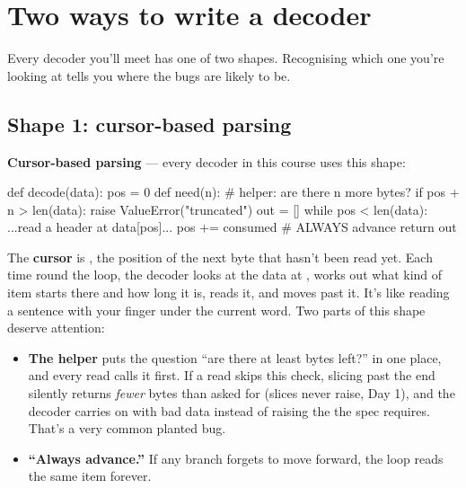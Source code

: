 \documentclass[10pt,a4paper]{article}
\begin{document}
\section{Two ways to write a decoder}
Every decoder you’ll meet has one of two shapes. Recognising which one you’re looking at tells you where the bugs are likely to be.
\subsection{Shape 1: cursor-based parsing}
\begin{keybox}
\textbf{Cursor-based parsing} — every decoder in this course uses this shape:
\end{keybox}
\begin{pycode}
def decode(data):
    pos = 0
    def need(n):                      # helper: are there n more bytes?
        if pos + n > len(data):
            raise ValueError("truncated")
    out = []
    while pos < len(data):
        ...read a header at data[pos]...
        pos += consumed               # ALWAYS advance
    return out
\end{pycode}
The \textbf{cursor} is , the position of the next byte that hasn’t been read yet. Each time round the loop, the decoder looks at the data at , works out what kind of item starts there and how long it is, reads it, and moves  past it. It’s like reading a sentence with your finger under the current word.
Two parts of this shape deserve attention:
\begin{itemize}
\item \textbf{The  helper} puts the question “are there at least  bytes left?” in one place, and every read calls it first. If a read skips this check, slicing past the end silently returns \emph{fewer} bytes than asked for (slices never raise, Day 1), and the decoder carries on with bad data instead of raising the  the spec requires. That’s a very common planted bug.
\item \textbf{“Always advance.”} If any branch forgets to move  forward, the loop reads the same item forever.
\end{itemize}
\end{document}
